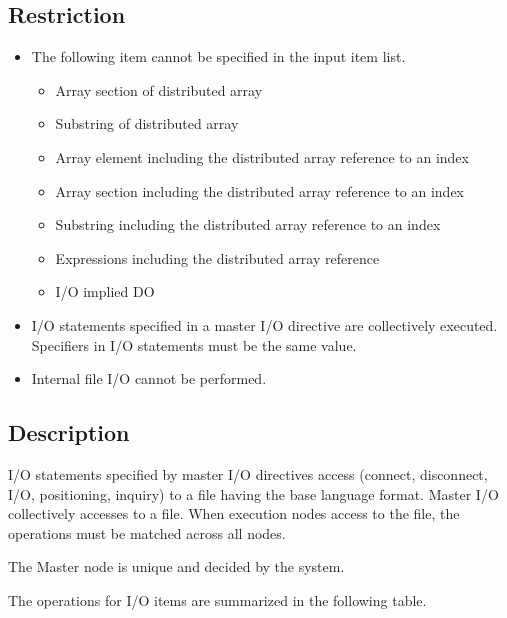    \subsection{Restriction}
   \begin{itemize}
    \item The following item cannot be specified in the input item list.

	  \begin{itemize}
	   \item Array section of distributed array
	   \item Substring of distributed array
	   \item Array element including the distributed array reference
		 to an index
	   \item Array section including the distributed array reference
		 to an index
	   \item Substring including the distributed array reference to
		 an index
	   \item Expressions including the distributed array reference
	   \item I/O implied DO
	  \end{itemize}

    \item I/O statements specified in a master I/O directive are
	  collectively executed. Specifiers in I/O statements must be
	  the same value.
    \item Internal file I/O cannot be performed.
   \end{itemize}
	  
  \subsection{Description}
   I/O statements specified by master I/O directives access (connect,
   disconnect, I/O, positioning, inquiry)   to a file having
   the base language format.
   Master I/O collectively accesses to a file.
   When execution nodes access to the file, the operations must be
   matched across all nodes.

   The Master node is unique and decided by the system.

   The operations for I/O items are summarized in the following table.

